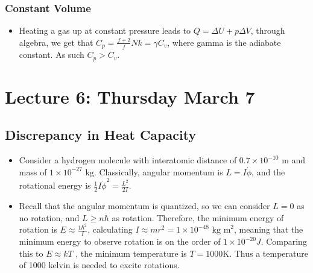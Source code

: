 \documentclass[8pt]{article}
\begin{document}
\subsubsection{Constant Volume}
\begin{itemize}
    \item Heating a gas up at constant pressure leads to $Q = \Delta U + p\Delta V$, through algebra, we get that $C_p = \frac{f+2}{f} Nk = \gamma C_v$, where gamma is the adiabate constant. As such $C_p > C_v$. 
\end{itemize}


\section{Lecture 6: Thursday March 7}
\subsection{Discrepancy in Heat Capacity}
\begin{itemize}
    \item Consider a hydrogen molecule with interatomic distance of $0.7 \times 10^{-10} \text{ m} $  and mass of $1 \times 10^{-27} \text{ kg}$. Classically, angular momentum is $L = I \dot{\phi}$, and the rotational energy is $\frac{1}{2} I \dot{\phi}^2 = \frac{L^2}{2I}$. 
    \item Recall that the angular momentum is quantized, so we can consider $L=0$ as no rotation, and $L \geq n\hbar$ as rotation. Therefore, the minimum energy of rotation is $E \approx \frac{1\hbar^2}{I}$, calculating $I \approx mr^2 = 1\times 10^{-48} \text{ kg m}^2$, meaning that the minimum energy to observe rotation is on the order of $1\times 10^{-20} J$. Comparing this to $E \approx kT$ , the minimum temperature is $T= 1000 \text{K}$. Thus a temperature of 1000 kelvin is needed to excite rotations. 
\end{itemize}
\end{document}
